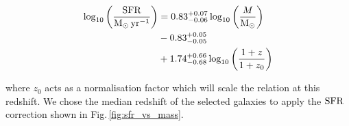 \begin{equation}
	\begin{split}
		\log_{10} \left ( \frac{\rm{SFR}}{\si{M_{\odot} . yr^{-1}}} \right ) & =  0.83_{-0.06}^{+0.07} \log_{10} \left ( \frac{M}{\si{M_{\odot}}} \right ) \\
		& - 0.83^{+0.05}_{-0.05} \\
		& + 1.74_{-0.68}^{+0.66} \log_{10} \left ( \frac{1+z}{1+z_0} \right )
		\label{eq:c}
	\end{split}
\end{equation}

where $z_0$ acts as a normalisation factor which will scale the relation at this redshift. We chose the median redshift of the selected galaxies to apply the $\rm{SFR}$ correction shown in Fig.\,\ref{fig:sfr_vs_mass}.



 
